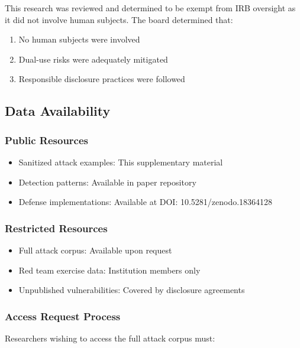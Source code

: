 \documentclass[
]{article}
\begin{document}
This research was reviewed and determined to be exempt from IRB
oversight as it did not involve human subjects. The board determined
that:

\begin{enumerate}
\item No human subjects were involved
\item Dual-use risks were adequately mitigated
\item Responsible disclosure practices were followed
\end{enumerate}

\subsection{Data Availability}\label{sec:data-availability}

\subsubsection{Public Resources}\label{sec:public-resources}

\begin{itemize}
\item Sanitized attack examples: This supplementary material
\item Detection patterns: Available in paper repository
\item Defense implementations: Available at DOI: 10.5281/zenodo.18364128
\end{itemize}

\subsubsection{Restricted Resources}\label{sec:restricted-resources}

\begin{itemize}
\item Full attack corpus: Available upon request
\item Red team exercise data: Institution members only
\item Unpublished vulnerabilities: Covered by disclosure agreements
\end{itemize}

\subsubsection{Access Request Process}\label{sec:access-request}

Researchers wishing to access the full attack corpus must:
\end{document}
